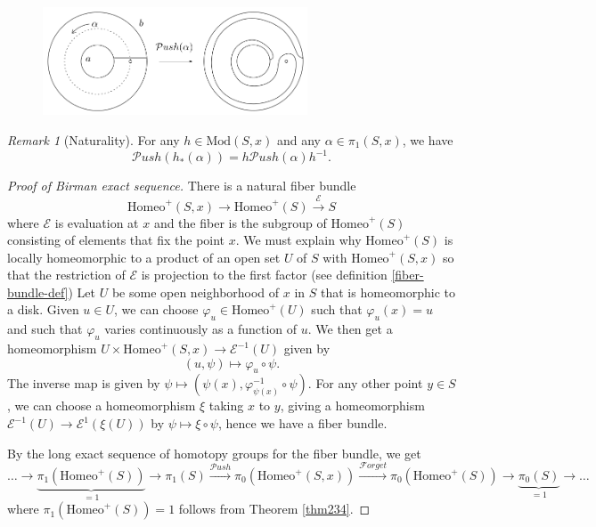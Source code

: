\documentclass[reqno]{amsart}
\theoremstyle{definition}
\theoremstyle{remark}
\newtheorem*{remark}{Remark}
\newcommand{\Mod}{{\mathrm{Mod}}}
\newcommand{\Homeo}{{\mathrm{Homeo}}}
\newcommand{\Push}{{\mathcal{P}}ush}
\newcommand{\Forget}{{\mathcal{F}}orget}
\begin{document}
 \begin{figure}[htpb]
     \centering
     \includegraphics[width=0.7\textwidth]{push-point-map.png}
     \label{fig:push-point-map-png}
 \end{figure}

 \begin{remark}[Naturality]
     For any $h \in \Mod (S,x)$ and any
     $\alpha \in \pi_1 \left( S,x \right) $, we have
     \[
     \Push \left( h_* \left( \alpha \right)  \right) 
     = h\Push \left( \alpha \right) h^{-1}.
     \] 
 \end{remark}



 \begin{proof}[Proof of Birman exact sequence]
     There is a natural fiber bundle
     \[
     \Homeo^{+}\left( S,x \right) 
     \to \Homeo^{+}(S) \stackrel{\mathcal{E}}{\to } S
     \] 
     where $\mathcal{E}$ is evaluation at
     $x$ and the fiber is the subgroup of
     $\Homeo^{+}(S)$ consisting of elements
     that fix the point $x$.
     We must explain why $\Homeo^{+}(S)$ is locally
     homeomorphic to a product of an open set
     $U$ of $S$ with $\Homeo^{+}(S,x)$ so that the
     restriction of $\mathcal{E}$ is projection to the
     first factor (see definition \ref{fiber-bundle-def})
     Let $U$ be some open neighborhood
     of $x$ in $S$ that is homeomorphic to
     a disk. Given
     $u \in U$, we can choose
     $\varphi_u \in \Homeo^{+}(U)$ such that
     $\varphi_u (x) = u$ and such that
     $\varphi_u$ varies continuously as a function
     of $u$. We then get a homeomorphism
     $U \times \Homeo^{+}(S,x) \to \mathcal{E}^{-1}(U)$ 
     given by
     \[
         \left( u, \psi  \right) \mapsto 
         \varphi_u \circ \psi .
     \] 
     The inverse map is given by
     $\psi \mapsto \left( \psi (x), 
     \varphi_{\psi (x)}^{-1} \circ \psi \right) $.
     For any other point $y \in S$, we can choose
     a homeomorphism
     $\xi$ taking  $x$ to $y$, giving a homeomorphism
     $\mathcal{E}^{-1}(U) \to \mathcal{E}^{1}\left( 
     \xi(U)\right) $ by $\psi \mapsto \xi \circ \psi $, hence
     we have a fiber bundle.

     By the long exact sequence of homotopy groups for
     the fiber bundle, we get
     \[
         \ldots \to \underbrace{\pi_1 \left( \Homeo^{+}(S) \right)}_{
         = 1}
         \to \pi_1(S) \stackrel{\Push}{\to} 
         \pi_0 \left( \Homeo^{+}(S,x) \right) 
         \stackrel{\Forget}{\to} \pi_0 \left( \Homeo^{+}(S) \right) \to 
         \underbrace{\pi_0(S)}_{=1} \to \ldots
     \] 
     where
     $\pi_1 \left( \Homeo^{+}(S) \right) = 1$ follows from
     Theorem \ref{thm234}.
 \end{proof}
\end{document}

